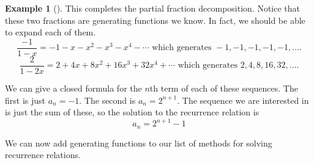 \documentclass[10pt,]{book}
\theoremstyle{plain}
\theoremstyle{definition}
\newtheorem{example}[theorem]{Example}
\theoremstyle{definition}
\theoremstyle{definition}
\numberwithin{equation}{chapter}
\begin{document}
\begin{example}[]
This completes the partial fraction decomposition. Notice that these two fractions are generating functions we know. In fact, we should be able to expand each of them.
\begin{equation*}
  \frac{-1}{1-x} = -1 - x - x^2 -x^3 - x^4 - \cdots \mbox{ which generates }  -1, -1, -1, -1, -1, \ldots.
\end{equation*}
%
\begin{equation*}
  \frac{2}{1-2x} = 2 + 4x + 8x^2 + 16x^3 + 32x^4 + \cdots \mbox{ which generates }  2, 4, 8, 16, 32, \ldots.
\end{equation*}\par

We can give a closed formula for the \(n\)th term of each of these sequences. The first is just \(a_n = -1\). The second is \(a_n = 2^{n+1}\). The sequence we are interested in is just the sum of these, so the solution to the recurrence relation is
\begin{equation*}
  a_n = 2^{n+1} - 1
\end{equation*}
%
\end{example}
\par

We can now add generating functions to our list of methods for solving recurrence relations.
%
\typeout{************************************************}
\typeout{************************************************}
\end{document}
